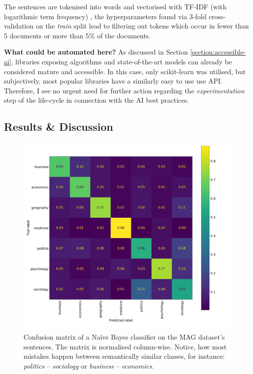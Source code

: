 The sentences are tokenised into words and vectorised with TF-IDF (with logarithmic term frequency) \cite{buckley1985implementation}, the hyperparameters found via 3-fold cross-validation on the \textit{train} split lead to filtering out tokens which occur in fewer than 5 documents or more than 5\% of the documents.

\begin{displayquote}
\textbf{What could be automated here?} As discussed in Section \ref{section:accessible-ai}, libraries exposing algorithms and state-of-the-art models can already be considered mature and accessible. In this case, only scikit-learn was utilised, but subjectively, most popular libraries have a similarly easy to use use API. Therefore, I see no urgent need for further action regarding the \textit{experimentation} step of the life-cycle in connection with the AI best practices.
\end{displayquote}

\subsection{Results \& Discussion}

\begin{figure}
    \centering
    \includegraphics[width=0.8\linewidth]{figures/mag-confusion.png}
    \caption{Confusion matrix of a Naïve Bayes classifier on the MAG dataset's sentences. The matrix is normalised column-wise. Notice, how most mistakes happen between semantically similar classes, for instance: \textit{politics} -- \textit{sociology} or \textit{business} -- \textit{economics}.}
    \label{fig:mag-confusion}
\end{figure}

